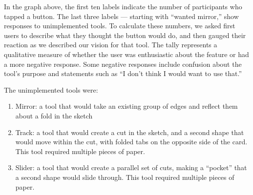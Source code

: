 
In the graph above, the first ten labels indicate the number of
participants who tapped a button. The last three labels --- starting
with ``wanted mirror,'' show responses to unimplemented tools. To
calculate these numbers, we asked first users to describe what they
thought the button would do, and then gauged their reaction as we
described our vision for that tool. The tally represents a qualitative
measure of whether the user was enthusiastic about the feature or had a
more negative response. Some negative responses include confusion about
the tool's purpose and statements such as ``I don't think I would want
to use that.''

The unimplemented tools were:

\begin{enumerate}
\def\labelenumi{\arabic{enumi}.}
\itemsep1pt\parskip0pt
\item
  Mirror: a tool that would take an existing group of edges and reflect
  them about a fold in the sketch
\item
  Track: a tool that would create a cut in the sketch, and a second
  shape that would move within the cut, with folded tabs on the opposite
  side of the card. This tool required multiple pieces of paper.
\item
  Slider: a tool that would create a parallel set of cuts, making a
  ``pocket'' that a second shape would slide through. This tool required
  multiple pieces of paper.
\end{enumerate}

